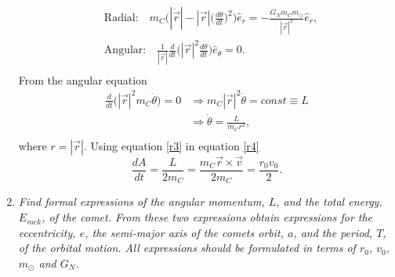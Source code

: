 \begin{example}
\begin{enumerate}
		\begin{equation}
			\begin{split}
				&\text{Radial:} \quad m_C\bigg(|\ddot{\vec{r}}|-|\vec{r}|\bigg(\frac{d\theta}{dt}\bigg)^2\bigg)\hat{e}_r=-\frac{G_Nm_Cm_\odot}{|\vec{r}|^2}\hat{e}_r,\\
				&\text{Angular:} \quad \frac{1}{|\vec{r}|}\frac{d}{dt}\bigg(|\vec{r}|^2\frac{d\theta}{dt}\bigg)\hat{e}_\theta=0.\\
			\end{split}
			\label{shi}
		\end{equation} 
		From the angular equation
		\begin{equation}
			\begin{split}
				\frac{d}{dt}\bigg(|\vec{r}|^2m_C\dot{\theta}\bigg)=0&\Rightarrow m_C|\vec{r}|^2\dot{\theta}=const\equiv L\\
				&\Rightarrow \dot{\theta}=\frac{L}{m_Cr^2},\\
			\end{split}
			\label{r3}
		\end{equation} 
		where $r=|\vec{r}|$. Using equation \eqref{r3} in equation \eqref{r4}
		\begin{equation}
			\frac{dA}{dt}=\frac{L}{2m_C}=\frac{m_C\vec{r}\times \vec{v}}{2m_C}=\frac{r_0v_0}{2}.
			\label{r15}
		\end{equation} 
		
		\item \emph{Find formal expressions of the angular momentum, $L$, and the total energy, $E_{mek}$, of the comet. From these two expressions obtain expressions for the eccentricity, $e$, the semi-major axis of the comets orbit, $a$, and the period, $T$, of the orbital motion. All expressions should be formulated in terms of $r_0$, $v_0$, $m_\odot$ and $G_N$.}
		

\end{enumerate}
\end{example}
